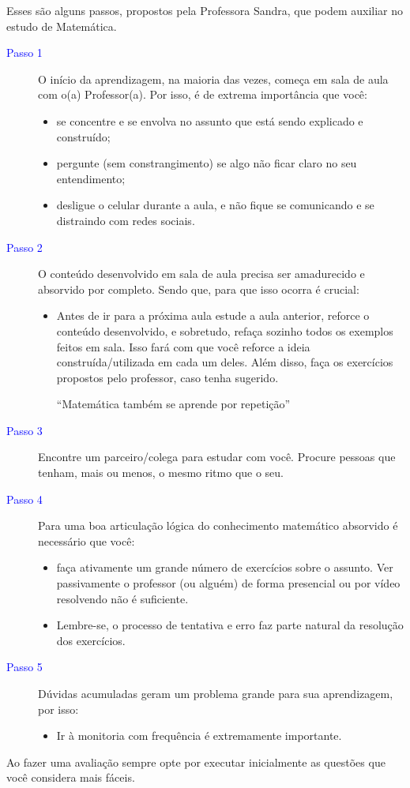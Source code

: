 Esses são alguns passos, propostos pela Professora Sandra, que podem auxiliar no estudo de Matemática.
\begin{description}
    \item[\textcolor{blue}{Passo 1}] O início da aprendizagem, na maioria das vezes, começa em sala de aula com o(a) Professor(a).
        Por isso, é de extrema importância que você:
        \begin{itemize}
            \item se concentre e se envolva no assunto que está sendo explicado e construído;
            \item pergunte (sem constrangimento) se algo não ficar claro no seu entendimento;
            \item desligue o celular durante a aula, e não fique se comunicando e se distraindo com redes sociais.
        \end{itemize}
    \item[\textcolor{blue}{Passo 2}] O conteúdo desenvolvido em sala de aula precisa ser amadurecido e absorvido por completo.
        Sendo que, para que isso ocorra é crucial:
        \begin{itemize}
            \item Antes de ir para a próxima aula estude a aula anterior, reforce o conteúdo desenvolvido,
                e sobretudo, refaça sozinho todos os exemplos feitos em sala. Isso fará com que você reforce
                a ideia construída/utilizada em cada um deles. Além disso, faça os exercícios propostos pelo
                professor, caso tenha sugerido.
                \begin{center}
                    ``Matemática também se aprende por repetição''
                \end{center}
        \end{itemize}
    \item[\textcolor{blue}{Passo 3}] Encontre um parceiro/colega para estudar com você. Procure pessoas que tenham,
        mais ou menos, o mesmo ritmo que o seu.
    \item[\textcolor{blue}{Passo 4}] Para uma boa articulação lógica do conhecimento matemático absorvido é necessário que você:
        \begin{itemize}
            \item faça ativamente um grande número de exercícios sobre o assunto. Ver passivamente o professor
                (ou alguém) de forma presencial ou por vídeo resolvendo não é suficiente.
            \item Lembre-se, o processo de tentativa e erro faz parte natural da resolução dos exercícios.
        \end{itemize}
    \item[\textcolor{blue}{Passo 5}] Dúvidas acumuladas geram um problema grande para sua aprendizagem, por isso:
        \begin{itemize}
            \item Ir à monitoria com frequência é extremamente importante.
        \end{itemize}
\end{description}
Ao fazer uma avaliação sempre opte por executar inicialmente as questões que você considera mais fáceis.

